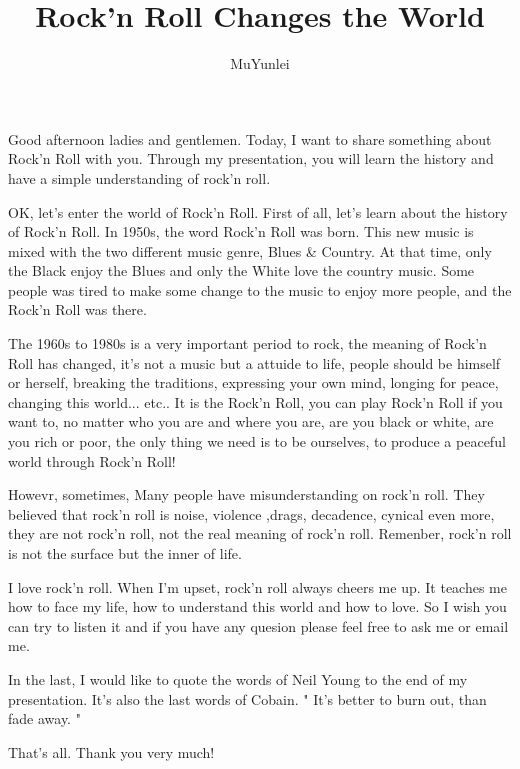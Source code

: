 \documentclass{article}
\title{Rock'n Roll Changes the World}
\author{MuYunlei}
\begin{document}
\maketitle

Good afternoon ladies and gentlemen. Today, I want to share something about Rock'n Roll with you. Through my presentation, you will learn the history and have a simple understanding of rock'n roll. 

OK, let's enter the world of Rock'n Roll. First of all, let's learn about the history of Rock'n Roll. In 1950s, the word Rock'n Roll was born. This new music is mixed with the two different music genre, Blues \& Country. At that time, only the Black enjoy the Blues and only the White love the country music. Some people was tired to make some change to the music to enjoy more people, and the Rock'n Roll was there. 

The 1960s to 1980s is a very important period to rock, the meaning of Rock'n Roll has changed, it's not a music but a attuide to life, people should be himself or herself, breaking the traditions, expressing your own mind, longing for peace, changing this world... etc.. It is the Rock'n Roll, you can play Rock'n Roll if you want to, no matter who you are and where you are, are you black or white, are you rich or poor, the only thing we need is to be ourselves, to produce a peaceful world through Rock'n Roll! 

Howevr, sometimes, Many people have misunderstanding on rock'n roll. They believed that rock'n roll is noise, violence ,drags, decadence, cynical even more, they are not rock'n roll, not the real meaning of rock'n roll. Remenber, rock'n roll is not the surface but the inner of life.

I love rock'n roll. When I'm upset, rock'n roll always cheers me up. It teaches me how to face my life, how to understand this world and how to love. So I wish you can try to listen it and if you have any quesion please feel free to ask me or email me.

In the last, I would like to quote the words of Neil Young to the end of my presentation. It's also the last words of Cobain. " It's better to burn out, than fade away. " 

That's all. Thank you very much!
\end{document}

